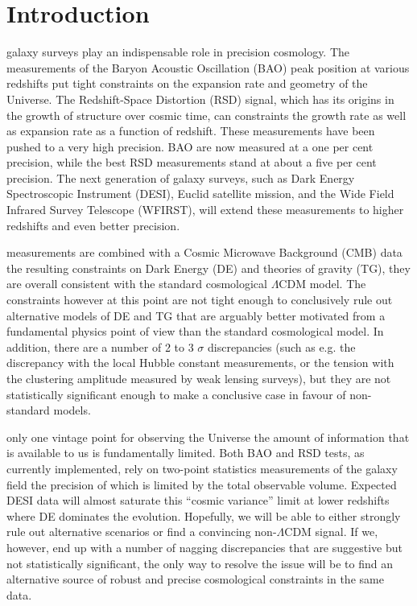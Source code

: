 
\newpage
\setcounter{page}{1}


\section{Introduction} %
galaxy surveys play an indispensable role in precision cosmology.  The
measurements of the Baryon Acoustic Oscillation (BAO) peak position at various
redshifts put tight constraints on the expansion rate and geometry of the
Universe. The Redshift-Space Distortion (RSD) signal, which has its origins in
the growth of structure over cosmic time, can constraints the growth rate as
well as expansion rate as a function of redshift. These measurements have been
pushed to a very high precision. BAO are now measured at a one per cent
precision,  while the best RSD measurements stand at about a five per cent
precision. The next generation of galaxy surveys, such as Dark Energy
Spectroscopic Instrument (DESI), Euclid satellite mission, and the Wide Field
Infrared Survey Telescope (WFIRST), will extend these measurements to higher
redshifts and even better precision.

measurements are combined with a Cosmic Microwave Background (CMB) data the
resulting constraints on Dark Energy (DE) and theories of gravity (TG), they
are overall consistent with the standard cosmological  $\Lambda$CDM model. The
constraints however at this point are not tight enough to conclusively rule
out alternative models of DE and TG that are arguably better motivated from a
fundamental physics point of view than the standard cosmological model. In
addition, there are a number of 2 to 3 $\sigma$ discrepancies (such as e.g.
the discrepancy with the local Hubble constant measurements, or the tension
with the clustering amplitude measured by weak lensing surveys), but they are
not statistically significant enough to make a conclusive case in favour of
non-standard models.
 
only one vintage point for observing the Universe the amount of information
that is  available to us is fundamentally limited. Both BAO and RSD tests, as
currently implemented, rely on two-point statistics measurements of the galaxy
field the precision of which is limited by the total  observable volume.
Expected DESI data will almost saturate this ``cosmic variance'' limit at
lower redshifts where DE dominates the evolution. Hopefully, we will be able
to either strongly rule out alternative scenarios or find a convincing
non-$\Lambda$CDM signal. If we, however, end up with a number of nagging
discrepancies that are suggestive but not statistically significant, the only
way to resolve the issue will be to find an alternative source of robust and
precise cosmological constraints in the same data.

